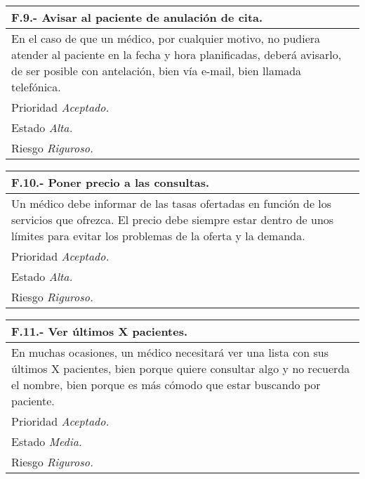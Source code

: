 	\begin{center}
	\begin{tabulary}{15cm}{|L|}
		\hline
			\bf{F.9.- Avisar al paciente de anulación de cita.} \\
		\hline
			En el caso de que un médico, por cualquier motivo, no pudiera atender al paciente en la fecha y hora planificadas, deberá avisarlo, de ser posible con antelación, bien vía e-mail, bien llamada telefónica. \\
		\hline
			Prioridad \textit{Aceptado.} \\
		\hline
			Estado \textit{Alta.} \\
		\hline
			Riesgo \textit{Riguroso.} \\
		\hline
	\end{tabulary}
	\end{center}

	\begin{center}
	\begin{tabulary}{15cm}{|L|}
		\hline
			\bf{F.10.- Poner precio a las consultas.} \\
		\hline
			Un médico debe informar de las tasas ofertadas en función de los servicios que ofrezca. El precio debe siempre estar dentro de unos límites para evitar los problemas de la oferta y la demanda. \\
		\hline
			Prioridad \textit{Aceptado.} \\
		\hline
			Estado \textit{Alta.} \\
		\hline
			Riesgo \textit{Riguroso.} \\
		\hline
	\end{tabulary}
	\end{center}

	\begin{center}
	\begin{tabulary}{15cm}{|L|}
		\hline
			\bf{F.11.- Ver últimos X pacientes.} \\
		\hline
			En muchas ocasiones, un médico necesitará ver una lista con sus últimos X pacientes, bien porque quiere consultar algo y no recuerda el nombre, bien porque es más cómodo que estar buscando por paciente. \\
		\hline
			Prioridad \textit{Aceptado.} \\
		\hline
			Estado \textit{Media.} \\
		\hline
			Riesgo \textit{Riguroso.} \\
		\hline
	\end{tabulary}
	\end{center}

